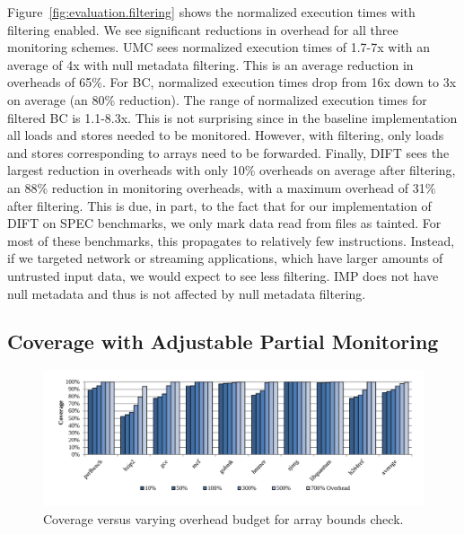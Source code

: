 Figure~\ref{fig:evaluation.filtering} shows the
normalized execution times with filtering enabled. We see significant
reductions in overhead for all three monitoring schemes. UMC sees normalized
execution times of 1.7-7x with an average of 4x with null metadata filtering.
This is an average reduction in overheads of 65\%. For BC, normalized execution
times drop from 16x down to 3x on average (an 80\% reduction). The range of normalized execution
times for filtered BC is 1.1-8.3x. This is not surprising since in the baseline
implementation all loads and stores needed to be monitored. However, with
filtering, only loads and stores corresponding to arrays need to be forwarded.
Finally, DIFT sees the largest reduction in overheads with only 10\% overheads
on average after filtering, an 88\% reduction in monitoring overheads, with a
maximum overhead of 31\% after filtering. This is due, in part, to the fact
that
for our implementation of DIFT on SPEC
benchmarks, we only mark data read from files as tainted. For most of these
benchmarks, this propagates to relatively few instructions. Instead, if we
targeted network or streaming applications, which have larger amounts of
untrusted input data, we would expect to see less filtering. IMP does not have
null metadata and thus is not affected by null metadata filtering.

\subsection{Coverage with Adjustable Partial Monitoring}

\begin{figure}
  \begin{center}
    \includegraphics[width=\linewidth]{figs/data_bc_sweep.pdf}
    \vspace{-0.2in}
    \caption{Coverage versus varying overhead budget for array bounds check.}
    \label{fig:evaluation.bc_sweep}
    \vspace{-0.2in}
  \end{center}
\end{figure}

